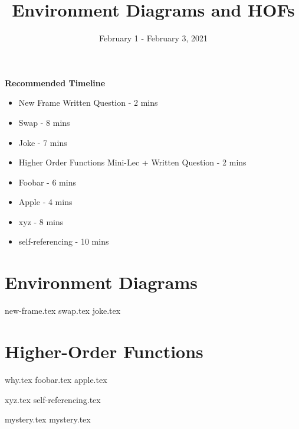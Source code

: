 \documentclass{exam}
\title{Environment Diagrams and HOFs}
\date{February 1 - February 3, 2021}
\begin{document}
\maketitle


\begin{blocksection}
\begin{guide}
\textbf{Recommended Timeline}
\begin{itemize}
    \item New Frame Written Question - 2 mins
    \item Swap - 8 mins
    \item Joke - 7 mins
    \item Higher Order Functions Mini-Lec + Written Question - 2 mins
    \item Foobar - 6 mins
    \item Apple - 4 mins
    \item xyz - 8 mins
    \item self-referencing - 10 mins
\end{itemize}
\end{guide}
\end{blocksection}


\section{Environment Diagrams}
\begin{questions}
{new-frame.tex}
{swap.tex}
\newpage
{joke.tex}
\end{questions}

\newpage
\section{Higher-Order Functions}
\begin{questions}
{why.tex}
{foobar.tex}
{apple.tex}

\newpage
{xyz.tex}
{self-referencing.tex}

\newpage
{mystery.tex}
{mystery.tex}
\clearpage

\end{questions}
\end{document}

